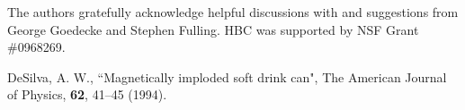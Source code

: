 \documentclass[prb,preprint]{revtex4-1}
\begin{document}
\begin{acknowledgments}
The authors gratefully acknowledge helpful discussions with and suggestions from George Goedecke and Stephen Fulling.  HBC was supported by NSF Grant \#0968269.\end{acknowledgments}

\begin{thebibliography}{99}

 DeSilva, A. W., ``Magnetically imploded soft drink can", The American Journal of Physics, \textbf{62}, 41--45 (1994).  



\end{thebibliography}



\end{document}
